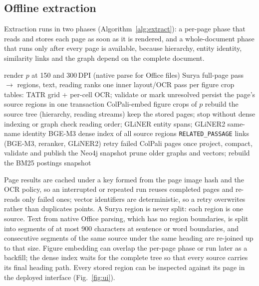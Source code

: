 \documentclass[conference]{IEEEtran}
\begin{document}
\subsection{Offline extraction}
Extraction runs in two phases (Algorithm~\ref{alg:extract}): a per-page phase that reads and stores each page as soon as it is rendered, and a whole-document phase that runs only after every page is available, because hierarchy, entity identity, similarity links and the graph depend on the complete document.

\begin{algorithm}[t]
\caption{Offline extraction pipeline (one document version)}\label{alg:extract}
\begin{algorithmic}[1]
  \State render $p$ at 150 and 300\,DPI (native parse for Office files)
  \State Surya full-page pass $\rightarrow$ regions, text, reading ranks 
  \State one inner layout/OCR pass per figure crop
  \State tables: TATR grid + per-cell OCR; validate or mark unresolved 
  \State persist the page's source regions in one transaction
  \State ColPali-embed figure crops of $p$ 
  \State rebuild the source tree (hierarchy, reading streams)
\EndFor
{} \State keep the stored pages; stop without dense indexing or graph \EndIf
\State check reading order; GLiNER entity spans; GLiNER2 same-name identity
\State BGE-M3 dense index of all source regions
\State \texttt{RELATED\_PASSAGE} links (BGE-M3, reranker, GLiNER2)
\State retry failed ColPali pages once
\State project, compact, validate and publish the Neo4j snapshot
\State prune older graphs and vectors; rebuild the BM25 postings snapshot
\end{algorithmic}
\end{algorithm}

Page results are cached under a key formed from the page image hash and the OCR policy, so an interrupted or repeated run reuses completed pages and re-reads only failed ones; vector identifiers are deterministic, so a retry overwrites rather than duplicates points. A Surya region is never split: each region is one source. Text from native Office parsing, which has no region boundaries, is split into segments of at most 900 characters at sentence or word boundaries, and consecutive segments of the same source under the same heading are re-joined up to that size. Figure embedding can overlap the per-page phase or run later as a backfill; the dense index waits for the complete tree so that every source carries its final heading path. Every stored region can be inspected against its page in the deployed interface (Fig.~\ref{fig:ui}).
\end{document}
